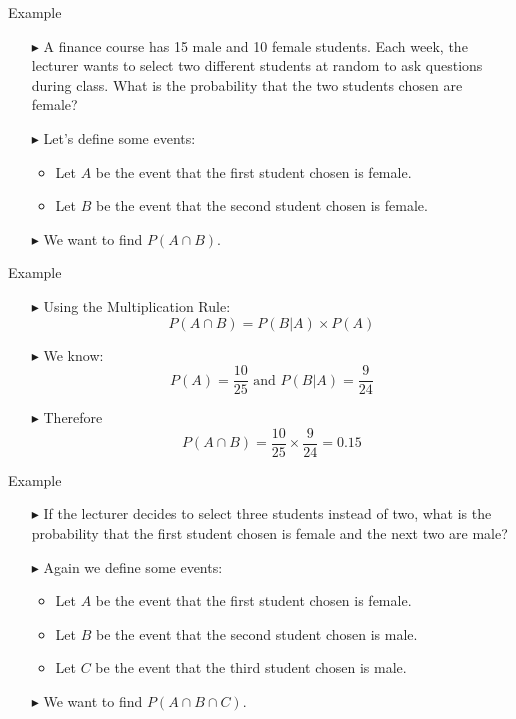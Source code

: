 \documentclass[12pt]{beamer}
\begin{document}
\begin{frame}{Example}
	\begin{itemize}
		\item[\color{blue}$\blacktriangleright$] A finance course has 15 male and 10 female students. Each week, the lecturer wants to select two different students at random to ask questions during class. What is the probability that the two students chosen are female?
		\item[\color{blue}$\blacktriangleright$] Let's define some events:
		\begin{itemize}
			\item Let $A$ be the event that the first student chosen is female.
			\item Let $B$ be the event that the second student chosen is female.
		\end{itemize}
		\item[\color{blue}$\blacktriangleright$] We want to find $P(A\cap B)$.
	\end{itemize}
\end{frame}
\begin{frame}{Example}
	\begin{itemize}
		\item[\color{blue}$\blacktriangleright$] Using the Multiplication Rule:
		$$P(A\cap B)=P(B|A)\times P(A)$$
		\item[\color{blue}$\blacktriangleright$] We know:
		$$P(A)=\frac{10}{25}\text{   and   }P(B|A)=\frac{9}{24}$$
		\item[\color{blue}$\blacktriangleright$] Therefore
		$$P(A\cap B)=\frac{10}{25}\times\frac{9}{24}=0.15$$
	\end{itemize}
\end{frame}
\begin{frame}{Example}
	\begin{itemize}
		\item[\color{blue}$\blacktriangleright$] If the lecturer decides to select three students instead of two, what is the probability that the first student chosen is female and the next two are male?
		\item[\color{blue}$\blacktriangleright$] Again we define some events:
		\begin{itemize}
			\item Let $A$ be the event that the first student chosen is female.
			\item Let $B$ be the event that the second student chosen is male.
			\item Let $C$ be the event that the third student chosen is male.
		\end{itemize}
		\item[\color{blue}$\blacktriangleright$] We want to find $P(A\cap B\cap C)$.
	\end{itemize}
\end{frame}
\end{document}
